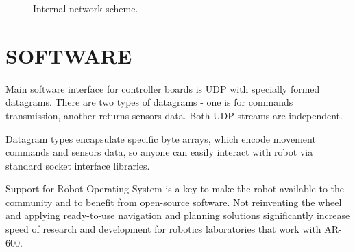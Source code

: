 \documentclass[letterpaper, 10 pt, conference]{ieeeconf}  %
\begin{document}
\begin{figure}[thpb]
\caption{Internal network scheme.}
\label{img:network}
\end{figure}  

\section{SOFTWARE}

Main software interface for controller boards is UDP with specially formed
datagrams. There are two types of datagrams - one is for commands transmission,
another returns sensors data. Both UDP streams are independent.

Datagram types encapsulate specific byte arrays, which encode movement
commands and sensors data, so anyone can easily interact with robot via standard
socket interface libraries.

Support for Robot Operating System \cite{c2} is a key to make the robot
available to the community and to benefit from open-source software. Not
reinventing the wheel and applying ready-to-use navigation and planning
solutions significantly increase speed of research and development for robotics
laboratories that work with AR-600.
\end{document}
